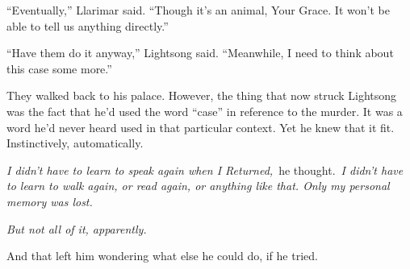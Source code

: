 “Eventually,” Llarimar said. “Though it’s an animal, Your Grace. It won’t be able to tell us anything directly.”

“Have them do it anyway,” Lightsong said. “Meanwhile, I need to think about this case some more.”

They walked back to his palace. However, the thing that now struck Lightsong was the fact that he’d used the word “case” in reference to the murder. It was a word he’d never heard used in that particular context. Yet he knew that it fit. Instinctively, automatically.

\textit{I didn’t have to learn to speak again when I Returned,}~he thought.~\textit{I didn’t have to learn to walk again, or read again, or anything like that. Only my personal memory was lost.}

\textit{But not all of it, apparently.}

And that left him wondering what else he could do, if he tried.

